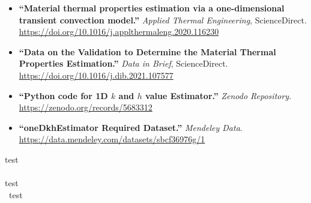 \documentclass[11pt]{article}
\begin{document}
\begin{itemize}
    \item \textbf{``Material thermal properties estimation via a one-dimensional transient convection model.''} \textit{Applied Thermal Engineering}, ScienceDirect. \\ 
    \url{https://doi.org/10.1016/j.applthermaleng.2020.116230}
    
    \item \textbf{``Data on the Validation to Determine the Material Thermal Properties Estimation.''} \textit{Data in Brief}, ScienceDirect. \\ 
    \url{https://doi.org/10.1016/j.dib.2021.107577}
    
    \item \textbf{``Python code for 1D $k$ and $h$ value Estimator.''} \textit{Zenodo Repository}. \\ 
    \url{https://zenodo.org/records/5683312}
    
    \item \textbf{``oneDkhEstimator Required Dataset.''} \textit{Mendeley Data}. \\ 
    \url{https://data.mendeley.com/datasets/sbcf36976g/1}
\end{itemize}


\vspace{10cm}

test
\\\\
test\\\
test
\end{document}
